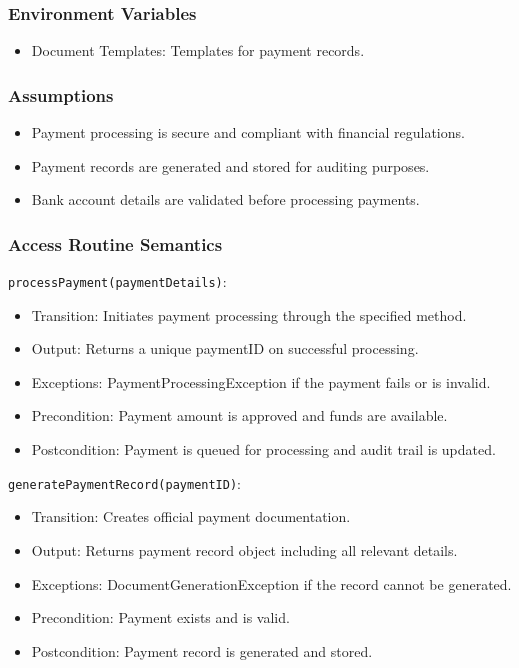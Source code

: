 \documentclass[12pt, titlepage]{article}
\begin{document}
\subsubsection{Environment Variables}
\begin{itemize}
    \item Document Templates: Templates for payment records.
\end{itemize}

\subsubsection{Assumptions}
\begin{itemize}
    \item Payment processing is secure and compliant with financial regulations.
    \item Payment records are generated and stored for auditing purposes.
    \item Bank account details are validated before processing payments.
\end{itemize}

\subsubsection{Access Routine Semantics}
\noindent \texttt{processPayment(paymentDetails)}:
\begin{itemize}
    \item Transition: Initiates payment processing through the specified method.
    \item Output: Returns a unique paymentID on successful processing.
    \item Exceptions: PaymentProcessingException if the payment fails or is invalid.
    \item Precondition: Payment amount is approved and funds are available.
    \item Postcondition: Payment is queued for processing and audit trail is updated.
\end{itemize}

\noindent \texttt{generatePaymentRecord(paymentID)}:
\begin{itemize}
    \item Transition: Creates official payment documentation.
    \item Output: Returns payment record object including all relevant details.
    \item Exceptions: DocumentGenerationException if the record cannot be generated.
    \item Precondition: Payment exists and is valid.
    \item Postcondition: Payment record is generated and stored.
\end{itemize}
\end{document}
